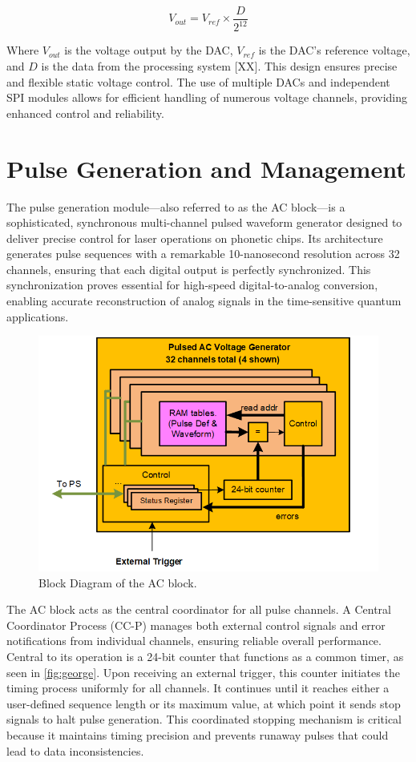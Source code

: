\begin{equation}
V_{out} = V_{ref} \times \frac{D}{2^{12}}
\end{equation}

Where $V_{out}$ is the voltage output by the DAC, $V_{ref}$ is the DAC's reference voltage, and $D$ is the data from the processing system [XX]. This design ensures precise and flexible static voltage control. The use of multiple DACs and independent SPI modules allows for efficient handling of numerous voltage channels, providing enhanced control and reliability.

\section{Pulse Generation and Management}

The pulse generation module—also referred to as the AC block—is a sophisticated, synchronous multi-channel pulsed waveform generator designed to deliver precise control for laser operations on phonetic chips. Its architecture generates pulse sequences with a remarkable 10-nanosecond resolution across 32 channels, ensuring that each digital output is perfectly synchronized. This synchronization proves essential for high-speed digital-to-analog conversion, enabling accurate reconstruction of analog signals in the time-sensitive quantum applications.
\begin{figure}[h]
    \centering
    \includegraphics[width=0.8\linewidth]{figures/5.3.png}
    \caption{Block Diagram of the AC block.}
    \label{fig:george}
\end{figure}
The AC block acts as the central coordinator for all pulse channels. A Central Coordinator Process (CC-P) manages both external control signals and error notifications from individual channels, ensuring reliable overall performance. Central to its operation is a 24-bit counter that functions as a common timer, as seen in \autoref{fig:george}. Upon receiving an external trigger, this counter initiates the timing process uniformly for all channels. It continues until it reaches either a user-defined sequence length or its maximum value, at which point it sends stop signals to halt pulse generation. This coordinated stopping mechanism is critical because it maintains timing precision and prevents runaway pulses that could lead to data inconsistencies.

